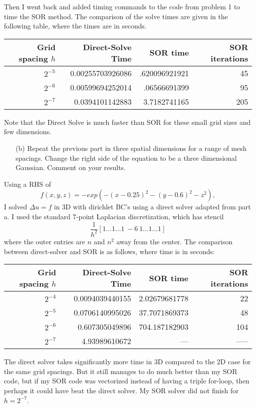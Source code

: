 \documentclass[12pt]{article}
\begin{document}
Then I went back and added timing commands to the code from problem 1 to time the SOR method.  The comparison of the solve times are given in the following table, where the times are in seconds.
\begin{center}
\begin{tabular}{rrrr}
\hline
   Grid spacing $h$ &   Direct-Solve Time &   SOR time &   SOR iterations \\
\hline
    $2^{-5}$ 	&      0.00255703926086 &  .620096921921 	&    45 \\
    $2^{-6}$	&    0.00599694252014 	& .06566691399	&    95 \\
    $2^{-7}$	&    0.0394101142883	& 3.7182741165 	&   205 \\
\hline
\end{tabular}
\end{center}

Note that the Direct Solve is much faster than SOR for these small grid sizes and few dimensions.
\begin{itemize}
\item[(b)] Repeat the previous part in three spatial dimensions for a range of mesh spacings.
Change the right side of the equation to be a three dimensional Gaussian. Comment on your results.
\end{itemize}
Using a RHS of $$f(x,y,z) = -exp(-(x-0.25)^2 - (y-0.6)^2 - z^2),$$
I solved $\Delta u = f$ in 3D with dirichlet BC's using a direct solver adapted from part a.  I used the standard 7-point Laplacian discretization, which has stencil
$$\dfrac{1}{h^2}[1 \dots 1 \dots 1\ -6 \ 1 \dots 1 \dots 1]$$
where the outer entries are $n$ and $n^2$ away from the center. The comparison between direct-solver and SOR is as follows, where time is in seconds:
\begin{center}
\begin{tabular}{rrrr}
\hline
   Grid spacing $h$ &   Direct-Solve Time & SOR time & SOR iterations\\
\hline
	$2^{-4}$	& 		0.0094039440155	& 2.02679681778 & 22 \\
    $2^{-5}$ 	&      0.0706140995026 & 37.7071869373 & 48\\
    $2^{-6}$	&    0.607305049896 & 704.187182903 & 104 \\
    $2^{-7}$	&    4.93989610672	&  --- & ----- \\
\hline
\end{tabular}
\end{center}
The direct solver takes significantly more time in 3D compared to the 2D case for the same grid spacings. But it still manages to do much better than my SOR code, but if my SOR code was vectorized instead of having a triple for-loop, then perhaps it could have beat the direct solver. My SOR solver did not finish for $h=2^{-7}$.\\
\end{document}

